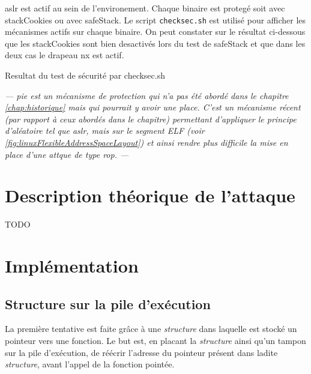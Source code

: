 \gls{aslr} est actif au sein de l'environement. Chaque binaire est protegé soit avec \gls{stackCookies} ou avec \gls{safeStack}. Le script \texttt{checksec.sh} \cite{CheckSec} est utilisé pour afficher les mécanismes actifs sur chaque binaire. On peut constater sur le résultat ci-dessous que les \gls{stackCookies} sont bien desactivés lors du test de \gls{safeStack} et que dans les deux cas le drapeau \gls{nx} est actif.

\begin{listing}
	\caption{Resultat du test de sécurité par checksec.sh}
	\label{lst:checksecRes}
\end{listing}

\textit{--- \gls{pie} est un mécanisme de protection qui n'a pas été abordé dans le chapitre \ref{chap:historique} mais qui pourrait y avoir une place. C'est un mécanisme récent (par rapport à ceux abordés dans le chapitre) permettant d'appliquer le principe d'aléatoire tel que \gls{aslr}, mais sur le segment ELF (voir \autoref{fig:linuxFlexibleAddressSpaceLayout}) et ainsi rendre plus difficile la mise en place d'une attque de type \gls{rop}. ---}

\section{Description théorique de l'attaque}


TODO

\section{Implémentation}

\subsection{Structure sur la pile d'exécution}

La première tentative est faite grâce à une \textit{structure} dans laquelle est stocké un pointeur vers une fonction. Le but est, en placant la \textit{structure} ainsi qu'un tampon sur la pile d'exécution, de réécrir l'adresse du pointeur présent dans ladite \textit{structure}, avant l'appel de la fonction pointée.

